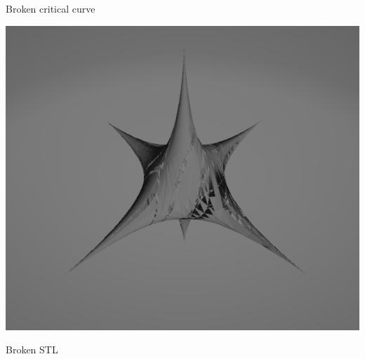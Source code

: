 \documentclass[paperwidth=46in, paperheight = 33.11in]{baposter}%
\begin{document}
\begin{poster}
{\begin{center}
\begin{minipage}[t]{0.90\linewidth}
\begin{minipage}[t]{0.48\linewidth}
\begin{center}
Broken critical curve
\end{center}

\end{minipage}
\hspace{0.01\linewidth}
\begin{minipage}[t]{0.48\linewidth}
\includegraphics[width=1.05\linewidth ,height= 0.80\linewidth]{pictures/fail_stl}
\begin{center}

Broken STL
\end{center}

\end{minipage}


\normalsize


\end{minipage}
\vspace{1mm}


\end{center}



}






\end{poster}
\end{document}
